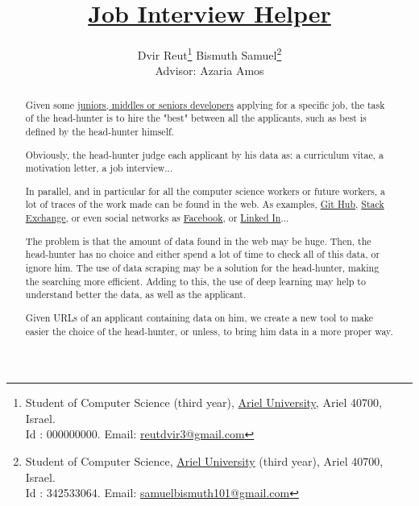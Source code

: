 \documentclass{article}
\title{
\href{https://github.com/SamuelBismuth/Job_interview_helper}
{Job Interview Helper}
}
\author{Dvir Reut\thanks{
Student of Computer Science (third year), \href{http://www.ariel.ac.il/}{Ariel University}, Ariel 40700, Israel. \\ Id : 000000000. Email: \href{mailto:reutdvir3@gmail.com}{reutdvir3@gmail.com}
} \hspace{1in} Bismuth Samuel\thanks{
Student of Computer Science, \href{http://www.ariel.ac.il/}{Ariel University} (third year), Ariel 40700, Israel. \\ Id : 342533064. Email: \href{mailto:samuelbismuth101@gmail.com}{samuelbismuth101@gmail.com}
} \\ Advisor: Azaria Amos}
\begin{document}
\maketitle

\begin{abstract}
   Given some \href{https://softwareengineering.stackexchange.com/questions/136163/whats-the-difference-between-junior-middle-and-senior-developers}{juniors, middles or seniors developers} applying for a specific job, the task of the head-hunter is to hire the "best" between all the applicants, such as best is defined by the head-hunter himself. \par
   Obviously, the head-hunter judge each applicant by his data as: a curriculum vitae, a motivation letter, a job interview... \par
   In parallel, and in particular for all the computer science workers or future workers, a lot of traces of the work made can be found in the web. As examples, \href{https://github.com/}{Git Hub}, \href{https://stackexchange.com/}{Stack Exchange}, or even social networks as \href{https://www.facebook.com/}{Facebook}, or \href{https://www.linkedin.com/feed/}{Linked In}... \par
   The problem is that the amount of data found in the web may be huge. Then, the head-hunter has no choice and either spend a lot of time to check all of this data, or ignore him.
   The use of data scraping may be a solution for the head-hunter, making the searching more efficient. Adding to this, the use of deep learning may help to understand better the data, as well as the applicant. \par
   Given URLs of an applicant containing data on him, we create a new tool to make easier the choice of the head-hunter, or unless, to bring him data in a more proper way. %
\end{abstract}
\end{document}
